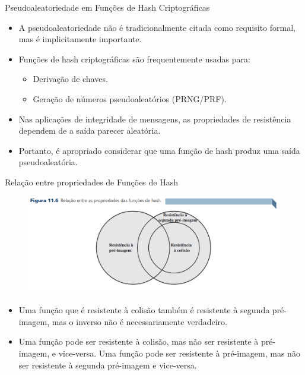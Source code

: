 \begin{frame}{Pseudoaleatoriedade em Funções de Hash Criptográficas}
    \begin{itemize}
        \item A pseudoaleatoriedade não é tradicionalmente citada como requisito formal, mas é implicitamente importante.
        \item Funções de hash criptográficas são frequentemente usadas para:
              \begin{itemize}
                  \item Derivação de chaves.
                  \item Geração de números pseudoaleatórios (PRNG/PRF).
              \end{itemize}
        \item Nas aplicações de integridade de mensagens, as propriedades de resistência dependem de a saída parecer aleatória.
        \item Portanto, é apropriado considerar que uma função de hash produz uma saída pseudoaleatória.
    \end{itemize}
\end{frame}

\begin{frame}{Relação entre propriedades de Funções de Hash}

    \begin{figure}
        \centering
        \includegraphics[width=0.9\linewidth]{Figuras/relacao-entre-propriedades-hash.png}

    \end{figure}
    \begin{itemize}


        \item  Uma função que é resistente à colisão também é resistente à segunda pré-imagem, mas o inverso não é necessariamente verdadeiro.
        \item Uma função pode ser resistente à colisão, mas não ser resistente à pré-imagem, e vice-versa. Uma função pode ser resistente à pré-imagem, mas não ser resistente à segunda pré-imagem e vice-versa.
    \end{itemize}
\end{frame}


